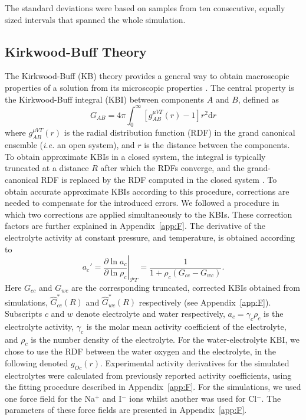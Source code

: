\documentclass[
journal=jctcce,
manuscript=letter]{achemso}
\begin{document}
The standard deviations were based on samples from ten consecutive, equally sized intervals that spanned the whole simulation. 

\subsection{Kirkwood-Buff Theory}

The Kirkwood-Buff (KB) theory provides a general way to obtain macroscopic properties of a solution from its microscopic properties \cite{kirkwood1951statistical}. The central property is the Kirkwood-Buff integral (KBI) between components $A$ and $B$, defined as
\begin{equation}
G_{AB} = 4\pi\int_{0}^{\infty}[g_{AB}^{\mu VT}(r)-1]r^2\textrm{d}r
\label{eq:defKBint_red}
\end{equation}
where $g_{AB}^{\mu VT}(r)$ is the radial distribution function (RDF) in the grand canonical ensemble (\emph{i.e.} an open system), and $r$ is the distance between the components. To obtain approximate KBIs in a closed system, the integral is typically truncated at a distance $R$ after which the RDFs converge, and the grand-canonical RDF is replaced by the RDF computed in the closed system \cite{Weerasinghe2003, Hess2009}. To obtain accurate approximate KBIs according to this procedure, corrections are needed to compensate for the introduced errors. We followed a procedure\cite{Milzetti2018} in which two corrections\cite{Ganguly2013,Krger2013} are applied simultaneously to the KBIs. These correction factors are further explained in Appendix~\ref{app:F}. The derivative of the electrolyte activity at constant pressure, and temperature, is obtained according to \cite{BenNaim1992}
\begin{equation}
a_{c}' = \left.\frac{\partial \ln a_c}{\partial \ln \rho_c}\right |_{\mathcal{P}T}=\frac{1}{1+\rho_{c}(G_{cc}-G_{wc})}.
\label{eq:actDer}
\end{equation}
Here $G_{cc}$ and $G_{wc}$ are the corresponding truncated, corrected KBIs obtained from simulations, $\hat{G}^*_{cc}(R)$ and $\hat{G}^*_{wc}(R)$ respectively (see Appendix~\ref{app:F}). Subscripts $c$ and $w$ denote electrolyte and water respectively, $a_c = \gamma_c \rho_c$ is the electrolyte activity, $\gamma_c$ is the molar mean activity coefficient of the electrolyte, and $\rho_c$ is the number density of the electrolyte. For the water-electrolyte KBI, we chose to use the RDF between the water oxygen and the electrolyte, in the following denoted $g_{Oc}(r)$. Experimental activity derivatives for the simulated electrolytes were calculated from previously reported activity coefficients\cite{Robinson1959}, using the fitting procedure described in Appendix~\ref{app:F}. For the simulations, we used one force field\cite{Tesei2018} for the Na$^+$ and I$^-$ ions whilst another\cite{Dang1995} was used for Cl$^-$. The parameters of these force fields are presented in Appendix~\ref{app:F}.
\end{document}
